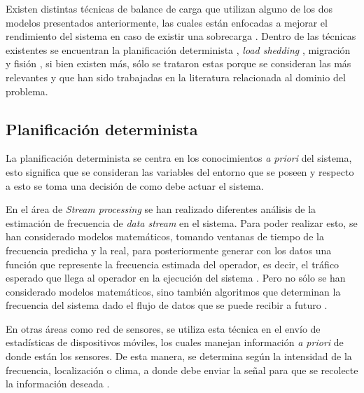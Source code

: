 Existen distintas técnicas de balance de carga que utilizan alguno de los dos modelos presentados anteriormente, las cuales están enfocadas a mejorar el rendimiento del sistema en caso de existir una sobrecarga \citep{HirzelSSGG13}. Dentro de las técnicas existentes se encuentran la planificación determinista \citep{XuCTS14, DongTS07}, \textit{load shedding} \citep{SheuC09}, migración \citep{XingZH05} y fisión \citep{GulisanoJPSV12, IshiiS11, GedikSHW14, FernandezMKP13}, si bien existen más, sólo se trataron estas porque se consideran las más relevantes y que han sido trabajadas en la literatura relacionada al dominio del problema.

\subsection{Planificación determinista}
\label{sec:planificacionBC}

La planificación determinista se centra en los conocimientos \textit{a priori} del sistema, esto significa que se consideran las variables del entorno que se poseen y respecto a esto se toma una decisión de como debe actuar el sistema. 

En el área de \textit{Stream processing} se han realizado diferentes análisis de la estimación de frecuencia de \textit{data stream} en el sistema. Para poder realizar esto, se han considerado modelos matemáticos, tomando ventanas de tiempo de la frecuencia predicha y la real, para posteriormente generar con los datos una función que represente la frecuencia estimada del operador, es decir, el tráfico esperado que llega al operador en la ejecución del sistema \citep{Ganguly09}. Pero no sólo se han considerado modelos matemáticos, sino también algoritmos que determinan la frecuencia del sistema dado el flujo de datos que se puede recibir a futuro \citep{BhuvanagiriGKS06}.

En otras áreas como red de sensores, se utiliza esta técnica en el envío de estadísticas de dispositivos móviles, los cuales manejan información \textit{a priori} de donde están los sensores. De esta manera, se determina según la intensidad de la frecuencia, localización o clima, a donde debe enviar la señal para que se recolecte la información deseada \citep{DongTS07}.

